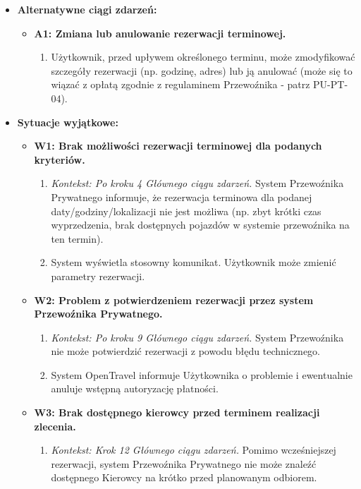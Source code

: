 \documentclass[a4paper,12pt]{article}
\begin{document}
\begin{itemize}
\begin{enumerate}
        \end{enumerate}
    \item \textbf{Alternatywne ciągi zdarzeń:}
        \begin{itemize}
            \item \textbf{A1: Zmiana lub anulowanie rezerwacji terminowej.}
                \begin{enumerate}
                    \item Użytkownik, przed upływem określonego terminu, może zmodyfikować szczegóły rezerwacji (np. godzinę, adres) lub ją anulować (może się to wiązać z opłatą zgodnie z regulaminem Przewoźnika - patrz PU-PT-04).
                \end{enumerate}
        \end{itemize}
    \item \textbf{Sytuacje wyjątkowe:}
        \begin{itemize}
            \item \textbf{W1: Brak możliwości rezerwacji terminowej dla podanych kryteriów.}
                \begin{enumerate}
                    \item \textit{Kontekst: Po kroku 4 Głównego ciągu zdarzeń.} System Przewoźnika Prywatnego informuje, że rezerwacja terminowa dla podanej daty/godziny/lokalizacji nie jest możliwa (np. zbyt krótki czas wyprzedzenia, brak dostępnych pojazdów w systemie przewoźnika na ten termin).
                    \item System wyświetla stosowny komunikat. Użytkownik może zmienić parametry rezerwacji.
                \end{enumerate}
            \item \textbf{W2: Problem z potwierdzeniem rezerwacji przez system Przewoźnika Prywatnego.}
                \begin{enumerate}
                    \item \textit{Kontekst: Po kroku 9 Głównego ciągu zdarzeń.} System Przewoźnika nie może potwierdzić rezerwacji z powodu błędu technicznego.
                    \item System OpenTravel informuje Użytkownika o problemie i ewentualnie anuluje wstępną autoryzację płatności.
                \end{enumerate}
            \item \textbf{W3: Brak dostępnego kierowcy przed terminem realizacji zlecenia.}
                \begin{enumerate}
                     \item \textit{Kontekst: Krok 12 Głównego ciągu zdarzeń.} Pomimo wcześniejszej rezerwacji, system Przewoźnika Prywatnego nie może znaleźć dostępnego Kierowcy na krótko przed planowanym odbiorem.

\end{enumerate}
\end{itemize}
\end{itemize}
\end{document}
